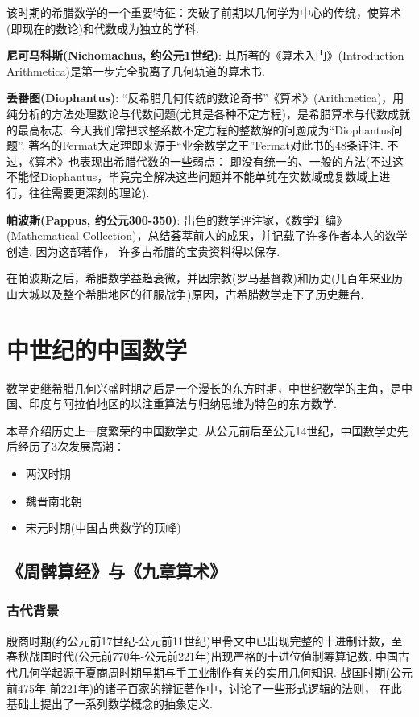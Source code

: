 \documentclass{Math_Note}
\begin{document}
该时期的希腊数学的一个重要特征：突破了前期以几何学为中心的传统，使算术(即现在的数论)和代数成为独立的学科.

\textbf{尼可马科斯(Nichomachus, 约公元1世纪)}: 其所著的《算术入门》(Introduction Arithmetica)是第一步完全脱离了几何轨道的算术书.

\textbf{丢番图(Diophantus)}: “反希腊几何传统的数论奇书”《算术》(Arithmetica)，用纯分析的方法处理数论与代数问题(尤其是各种不定方程)，是希腊算术与代数成就的最高标志.
今天我们常把求整系数不定方程的整数解的问题成为“Diophantus问题”. 著名的Fermat大定理即来源于“业余数学之王”Fermat对此书的48条评注. 不过，《算术》也表现出希腊代数的一些弱点：
即没有统一的、一般的方法(不过这不能怪Diophantus，毕竟完全解决这些问题并不能单纯在实数域或复数域上进行，往往需要更深刻的理论).

\textbf{帕波斯(Pappus, 约公元300-350)}: 出色的数学评注家，《数学汇编》(Mathematical Collection)，总结荟萃前人的成果，并记载了许多作者本人的数学创造. 因为这部著作，
许多古希腊的宝贵资料得以保存.

在帕波斯之后，希腊数学益趋衰微，并因宗教(罗马基督教)和历史(几百年来亚历山大城以及整个希腊地区的征服战争)原因，古希腊数学走下了历史舞台.

\section{中世纪的中国数学}
数学史继希腊几何兴盛时期之后是一个漫长的东方时期，中世纪数学的主角，是中国、印度与阿拉伯地区的以注重算法与归纳思维为特色的东方数学.

本章介绍历史上一度繁荣的中国数学史. 从公元前后至公元14世纪，中国数学史先后经历了3次发展高潮：
\begin{itemize}
    \item 两汉时期
    \item 魏晋南北朝
    \item 宋元时期(中国古典数学的顶峰)
\end{itemize}

\subsection{《周髀算经》与《九章算术》}
\subsubsection{古代背景}
殷商时期(约公元前17世纪-公元前11世纪)甲骨文中已出现完整的十进制计数，至春秋战国时代(公元前770年-公元前221年)出现严格的十进位值制筹算记数.
中国古代几何学起源于夏商周时期早期与手工业制作有关的实用几何知识. 战国时期(公元前475年-前221年)的诸子百家的辩证著作中，讨论了一些形式逻辑的法则，
在此基础上提出了一系列数学概念的抽象定义. 
\end{document}
